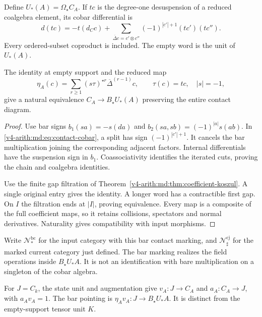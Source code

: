 Define $U_*(A)=\Omega_\star C_A$. If $tc$ is the
degree-one desuspension of a reduced coalgebra element,
its cobar differential is
\begin{equation}\label{v4-arith:md:eq:contact-cobar}
 d(tc)=-t(d_Cc)+
 \sum_{\overline\Delta c=c'\otimes c''}
       (-1)^{|c'|+1}(tc')(tc'').
\end{equation}
Every ordered-subset coproduct is included. The empty
word is the unit of $U_*(A)$.

\begin{proposition}
\label{v4-arith:md:prop:bar-marking}
The identity at empty support and the reduced map
\begin{equation}\label{v4-arith:md:eq:bar-marking}
 \eta_A(c)=\sum_{r\geq1}(s\tau)^{\star r}
                   \overline\Delta^{(r-1)}c,
 \qquad \tau(c)=tc,\quad |s|=-1,
\end{equation}
give a natural equivalence $C_A\to B_\star U_*(A)$
preserving the entire contact diagram.
\end{proposition}

\begin{proof}
Use bar signs $b_1(sa)=-s(da)$ and
$b_2(sa,sb)=(-1)^{|a|}s(ab)$.
In \eqref{v4-arith:md:eq:contact-cobar}, a split has
sign $(-1)^{|c'|+1}$. It cancels the bar multiplication
joining the corresponding adjacent factors. Internal
differentials have the suspension sign in $b_1$.
Coassociativity identifies the iterated cuts, proving
the chain and coalgebra identities.

Use the finite gap filtration of
Theorem~\ref{v4-arith:md:thm:coefficient-koszul}.
A single original entry gives the identity.
A longer word has a contractible first gap.
On $I$ the filtration ends at $|I|$, proving equivalence.
Every map is a composite of the full coefficient
maps, so it retains collisions, spectators and normal
derivatives. Naturality gives compatibility with
input morphisms.
\end{proof}

Write $\mathcal N_*^{\mathrm{bc}}$ for the input category
with this bar contact marking, and
$\mathcal N_\sharp^{\mathrm{cj}}$ for the marked current
category just defined. The bar marking realizes the
field operations inside $B_\star U_*A$. It is not an
identification with bare multiplication on a singleton
of the cobar algebra.

For $J=C_k$, the state unit and augmentation give
$v_A:J\to C_A$ and $a_A:C_A\to J$, with $a_Av_A=1$.
The bar pointing is $\eta_Av_A:J\to B_\star U_*A$.
It is distinct from the empty-support tensor unit $K$.

